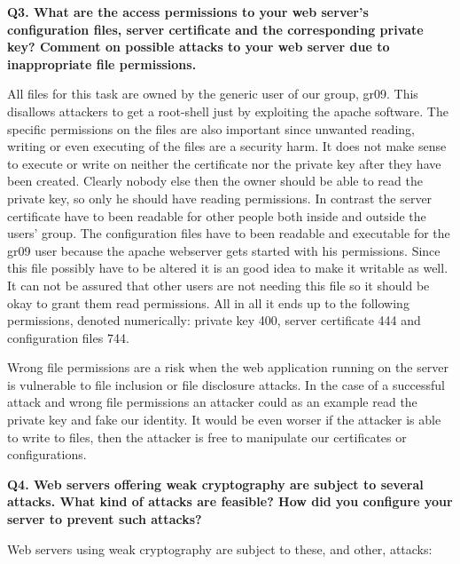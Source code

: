 \noindent
{\bf Q3. What are the access permissions to your web server’s configuration files,
server certificate and the corresponding private key? Comment on possible
attacks to your web server due to inappropriate file permissions.}
\newline

\noindent
All files for this task are owned by the generic user of our group, gr09. This disallows attackers to get a root-shell just by exploiting the apache software. The specific permissions on the files are also important since unwanted reading, writing or even executing of the files are a security harm. It does not make sense to execute or write on neither the certificate nor the private key after they have been created. Clearly nobody else then the owner should be able to read the private key, so only he should have reading permissions. In contrast the server certificate have to been readable for other people both inside and outside the users' group. The configuration files have to been readable and executable for the gr09 user because the apache webserver gets started with his permissions. Since this file possibly have to be altered it is an good idea to make it writable as well. 
It can not be assured that other users are not needing this file so it should be okay to grant them read permissions. All in all it ends up to the following permissions, denoted numerically: private key 400, server certificate 444 and configuration files 744. \cite {linuxsecurity} 
\newline

\noindent
Wrong file permissions are a risk when the web application running on the server is vulnerable to file inclusion or file disclosure attacks. In the case of a successful attack and wrong file permissions an attacker could as an example read the private key and fake our identity. It would be even worser if the attacker is able to write to files, then the attacker is free to manipulate our certificates or configurations.\cite{InclDiscl}
\newline


\noindent
{\bf Q4. Web servers offering weak cryptography are subject to several attacks.
What kind of attacks are feasible? How did you configure your server to prevent such attacks?}
\newline

\noindent
Web servers using weak cryptography are subject to these, and other, attacks:

